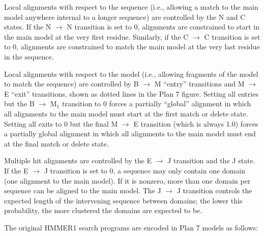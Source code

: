 \documentclass[11pt]{report}
\begin{document}
Local alignments with respect to the sequence (i.e., allowing a match
to the main model anywhere internal to a longer sequence) are
controlled by the N and C states. If the N $\rightarrow$ N transition
is set to 0, alignments are constrained to start in the main model at
the very first residue. Similarly, if the C $\rightarrow$ C transition
is set to 0, alignments are constrained to match the main model at the
very last residue in the sequence.

Local alignments with respect to the model (i.e., allowing fragments
of the model to match the sequence) are controlled by B $\rightarrow$
M ``entry'' transitions and M $\rightarrow$ E ``exit'' transitions,
shown as dotted lines in the Plan 7 figure. Setting all entries but
the B $\rightarrow$ M$_1$ transition to 0 forces a partially
``global'' alignment in which all alignments to the main model must
start at the first match or delete state. Setting all exits to 0 but
the final M $\rightarrow$ E transition (which is always 1.0) forces a
partially global alignment in which all alignments to the main model
must end at the final match or delete state.

Multiple hit alignments are controlled by the E $\rightarrow$ J
transition and the J state. If the E $\rightarrow$ J transition is set
to 0, a sequence may only contain one domain (one alignment to the
main model). If it is nonzero, more than one domain per sequence can
be aligned to the main model. The J $\rightarrow$ J transition
controls the expected length of the intervening sequence between
domains; the lower this probability, the more clustered the domains
are expected to be.

The original HMMER1 search programs are encoded in Plan 7 models as
follows:
\end{document}
